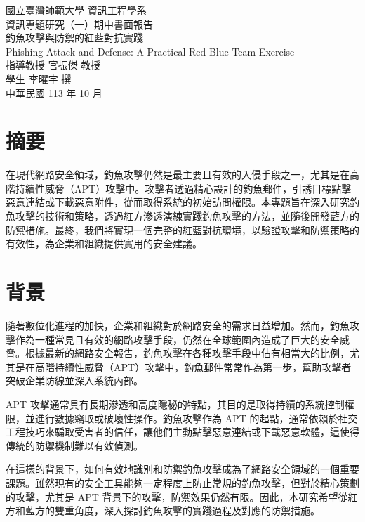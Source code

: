 \documentclass[a4paper,12pt]{article}
\begin{document}
\begin{titlepage}
  \begin{center}
    \vspace*{2cm}
    {\fontsize{16pt}{16pt}\selectfont 國立臺灣師範大學 資訊工程學系}\\[1cm]
    {\fontsize{16pt}{16pt} 資訊專題研究（一）期中書面報告}\\[4cm]
    {\fontsize{16pt}{16pt}\selectfont 釣魚攻擊與防禦的紅藍對抗實踐}\\[1cm]
    {\fontsize{16pt}{16pt}\selectfont Phishing Attack and Defense: A Practical Red-Blue Team Exercise}\\[9cm]
    {\fontsize{12pt}{12pt}\selectfont 指導教授 官振傑 教授}\\[0.5cm]
    {\fontsize{12pt}{12pt}\selectfont 學生 李曜宇 撰}\\[0.5cm]
    {\fontsize{12pt}{12pt}\selectfont 中華民國 113 年 10 月}
  \end{center}
\end{titlepage}

\newpage

\section*{摘要}
在現代網路安全領域，釣魚攻擊仍然是最主要且有效的入侵手段之一，尤其是在高階持續性威脅（APT）攻擊中。攻擊者透過精心設計的釣魚郵件，引誘目標點擊惡意連結或下載惡意附件，從而取得系統的初始訪問權限。本專題旨在深入研究釣魚攻擊的技術和策略，透過紅方滲透演練實踐釣魚攻擊的方法，並隨後開發藍方的防禦措施。最終，我們將實現一個完整的紅藍對抗環境，以驗證攻擊和防禦策略的有效性，為企業和組織提供實用的安全建議。

\section{背景}
隨著數位化進程的加快，企業和組織對於網路安全的需求日益增加。然而，釣魚攻擊作為一種常見且有效的網路攻擊手段，仍然在全球範圍內造成了巨大的安全威脅。根據最新的網路安全報告，釣魚攻擊在各種攻擊手段中佔有相當大的比例，尤其是在高階持續性威脅（APT）攻擊中，釣魚郵件常常作為第一步，幫助攻擊者突破企業防線並深入系統內部。

APT 攻擊通常具有長期滲透和高度隱秘的特點，其目的是取得持續的系統控制權限，並進行數據竊取或破壞性操作。釣魚攻擊作為 APT 的起點，通常依賴於社交工程技巧來騙取受害者的信任，讓他們主動點擊惡意連結或下載惡意軟體，這使得傳統的防禦機制難以有效偵測。

在這樣的背景下，如何有效地識別和防禦釣魚攻擊成為了網路安全領域的一個重要課題。雖然現有的安全工具能夠一定程度上防止常規的釣魚攻擊，但對於精心策劃的攻擊，尤其是 APT 背景下的攻擊，防禦效果仍然有限。因此，本研究希望從紅方和藍方的雙重角度，深入探討釣魚攻擊的實踐過程及對應的防禦措施。
\end{document}
